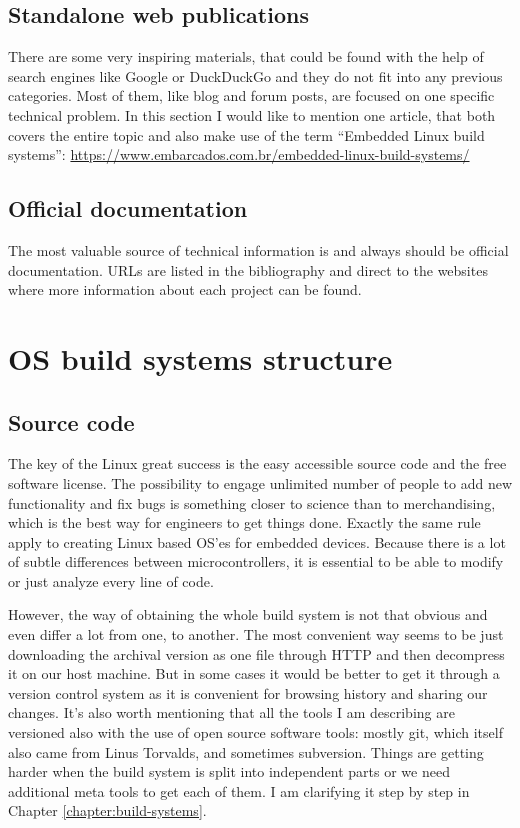 \documentclass[printmode]{mgr}
\begin{document}
\subsection*{Standalone web publications}

There are some very inspiring materials, that could be found with the help of search engines like Google or DuckDuckGo and they do not fit into any previous categories.
Most of them, like blog and forum posts, are focused on one specific technical problem.
In this section I would like to mention one article, that both covers the entire topic and also make use of the term ``Embedded Linux build systems'': \url{https://www.embarcados.com.br/embedded-linux-build-systems/}

\subsection*{Official documentation}
The most valuable source of technical information is and always should be official documentation. URLs are listed in the bibliography and direct to the websites where more information about each project can be found.



\section{OS build systems structure}
\label{section:builders-structure}

\subsection*{Source code}

The key of the Linux great success is the easy accessible source code and the free software license. The possibility to engage unlimited number of people to add new functionality and fix bugs is something closer to science than to merchandising, which is the best way for engineers to get things done. Exactly the same rule apply to creating Linux based OS'es for embedded devices. Because there is a lot of subtle differences between microcontrollers, it is essential to be able to modify or just analyze every line of code.

However, the way of obtaining the whole build system is not that obvious and even differ a lot from one, to another. The most convenient way seems to be just downloading the archival version as one file through HTTP and then decompress it on our host machine. But in some cases it would be better to get it through a version control system as it is convenient for browsing history and sharing our changes. It's also worth mentioning that all the tools I am describing are versioned also with the use of open source software tools: mostly git, which itself also came from Linus Torvalds, and sometimes subversion. Things are getting harder when the build system is split into independent parts or we need additional meta tools to get each of them. I am clarifying it step by step in Chapter \ref{chapter:build-systems}.
\end{document}
